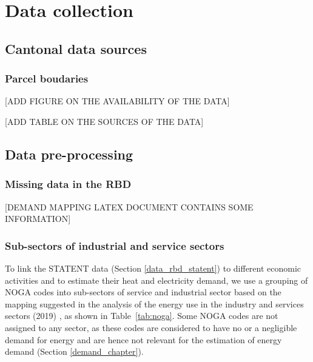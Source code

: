 \appendix
\chapter{Data collection}

\section{Cantonal data sources}

\subsection*{Parcel boudaries}
\label{app:canton_parcels}

 [ADD FIGURE ON THE AVAILABILITY OF THE DATA]
 
  [ADD TABLE ON THE SOURCES OF THE DATA]

\section{Data pre-processing}

\subsection*{Missing data in the RBD}
\label{app:rbd}
[DEMAND MAPPING LATEX DOCUMENT CONTAINS SOME INFORMATION]

\subsection*{Sub-sectors of industrial and service sectors}
\label{app:noga}

To link the STATENT data (Section \ref{data_rbd_statent}) to different economic activities and to estimate their heat and electricity demand, we use a grouping of NOGA codes into sub-sectors of service and industrial sector based on the mapping suggested in the analysis of the energy use in the industry and services sectors (2019) \cite{bfe_energieverbrauch_2019}, as shown in Table~\ref{tab:noga}. Some NOGA codes are not assigned to any sector, as these codes are considered to have no or a negligible demand for energy and are hence not relevant for the estimation of energy demand (Section \ref{demand_chapter}).

